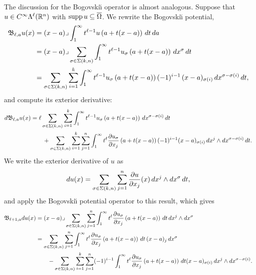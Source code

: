\documentclass[10pt,letterpaper]{article}
\begin{document}
The discussion for the Bogovski\u{\i} operator is almost analogous. 
Suppose that $u \in C^{\infty}\Lambda^{\ell}({\mathbb R}^n)$ with $\operatorname{supp} u \subseteq \overline\Omega$.
We rewrite the Bogovski\u{\i} potential,
\begin{align*}
    {\mathfrak B}_{\ell,a} u(x) 
    &= 
    (x-a)\lrcorner \int_{1}^\infty t^{\ell-1} u\left(a+t(x-a)\right)\,dt\,da\;
    \\&
    = 
    (x-a)\lrcorner 
    \sum_{\sigma \in \Sigma(k,n)}
    \int_{1}^\infty 
    t^{\ell-1} u_{\sigma}\left(a+t(x-a)\right) \,dx^{\sigma} \,dt 
    \\&
    = 
    \sum_{\sigma \in \Sigma(k,n)} \sum_{i=1}^{k}
    \int_{1}^\infty 
    t^{\ell-1} u_{\sigma}\left(a+t(x-a)\right) (-1)^{i-1} \,(x-a)_{\sigma(i) } \,dx^{\sigma-\sigma(i)} \,dt 
    ,
\end{align*}
and compute its exterior derivative:
\begin{align*}
    d {\mathfrak B}_{\ell,a} u(x) 
    &= 
    \ell 
    \sum_{\sigma \in \Sigma(k,n)} \sum_{i=1}^{k}
    \int_{1}^\infty 
    t^{\ell-1} u_{\sigma}\left(a+t(x-a)\right) \,dx^{\sigma-\sigma(i)} \,dt 
    \\&\qquad
    + 
    \sum_{\sigma \in \Sigma(k,n)} \sum_{i=1}^{k} \sum_{j=1}^{n}
    \int_{1}^\infty 
    t^{\ell} \frac{ \partial u_{\sigma} }{\partial x_{j}}\left(a+t(x-a)\right) (-1)^{i-1} (x-a)_{\sigma(i) } \,dx^{j} \wedge dx^{\sigma-\sigma(i)} \,dt 
    .
\end{align*}
We write the exterior derivative of $u$ as 
\begin{align*}
    d u(x)
    =
    \sum_{\sigma \in \Sigma(k,n)} \sum_{j=1}^{n}
    \frac{ \partial u }{\partial x_{j}}(x) \,dx^{j} \wedge dx^{\sigma} \,dt 
    ,
\end{align*}
and apply the Bogovski\u{\i} potential operator to this result, which gives 
\begin{align*}
    {\mathfrak B}_{\ell+1,a} d u(x)
    &=
    (x-a)\lrcorner 
    \sum_{\sigma \in \Sigma(k,n)} \sum_{j=1}^{n}
    \int_{1}^\infty t^{\ell} \frac{ \partial u_{\sigma} }{\partial x_{j}}\left(a+t(x-a)\right) \,dt 
    \,dx^{j} \wedge dx^{\sigma}
    \\&
    = 
    \sum_{\sigma \in \Sigma(k,n)} \sum_{j=1}^{n}
    \int_{1}^\infty t^{\ell} \frac{ \partial u_{\sigma} }{\partial x_{j}}\left(a+t(x-a)\right) \,dt \,(x-a)_{j} \,dx^{\sigma}
    \\&\qquad 
    - 
    \sum_{\sigma \in \Sigma(k,n)} \sum_{i=1}^{k} \sum_{j=1}^{n}
    (-1)^{i-1}
    \int_{1}^\infty t^{\ell} \frac{ \partial u_{\sigma} }{\partial x_{j}}\left(a+t(x-a)\right) \,dt 
    (x-a)_{\sigma(i)} \,dx^{j} \wedge dx^{\sigma-\sigma(i)}
    .
\end{align*}
\end{document}
